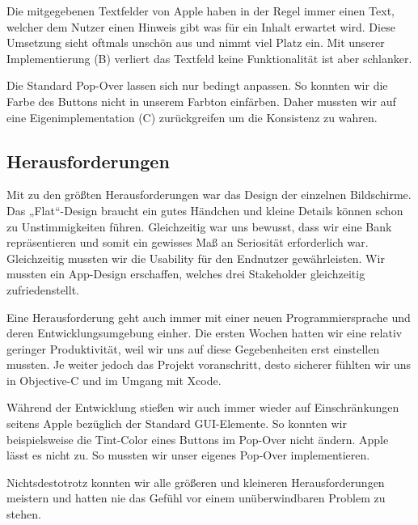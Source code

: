 Die mitgegebenen Textfelder von Apple haben in der Regel immer einen Text, welcher dem Nutzer einen Hinweis gibt was für ein Inhalt erwartet wird. Diese Umsetzung sieht oftmals unschön aus und nimmt viel Platz ein. Mit unserer Implementierung (B) verliert das Textfeld keine Funktionalität ist aber schlanker.

Die Standard Pop-Over lassen sich nur bedingt anpassen. So konnten wir die Farbe des Buttons nicht in unserem Farbton einfärben. Daher mussten wir auf eine Eigenimplementation (C) zurückgreifen um die Konsistenz zu wahren.


\subsection{Herausforderungen}
	Mit zu den größten Herausforderungen war das Design der einzelnen Bildschirme. Das „Flat“-Design braucht ein gutes Händchen und kleine Details können schon zu Unstimmigkeiten führen. Gleichzeitig war uns bewusst, dass wir eine Bank repräsentieren und somit ein gewisses Maß an Seriosität erforderlich war. Gleichzeitig mussten wir die Usability für den Endnutzer gewährleisten. Wir mussten ein App-Design erschaffen, welches drei Stakeholder gleichzeitig zufriedenstellt.

%

	Eine Herausforderung geht auch immer mit einer neuen Programmiersprache und deren Entwicklungsumgebung einher. Die ersten Wochen hatten wir eine relativ geringer Produktivität, weil wir uns auf diese Gegebenheiten erst einstellen mussten. Je weiter jedoch das Projekt voranschritt, desto sicherer fühlten wir uns in Objective-C und im Umgang mit Xcode.

	Während der Entwicklung stießen wir auch immer wieder auf Einschränkungen seitens Apple bezüglich der Standard GUI-Elemente. So konnten wir beispielsweise die Tint-Color eines Buttons im Pop-Over nicht ändern. Apple lässt es nicht zu. So mussten wir unser eigenes Pop-Over implementieren.

	Nichtsdestotrotz konnten wir alle größeren und kleineren Herausforderungen meistern und hatten nie das Gefühl vor einem unüberwindbaren Problem zu stehen.